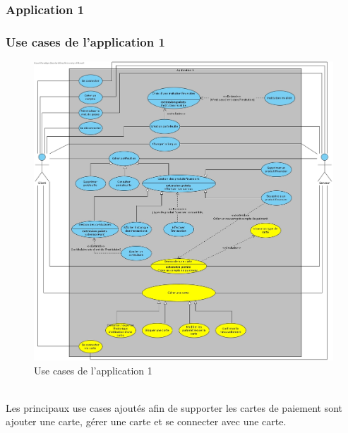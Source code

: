 \documentclass[../rapport.tex]{subfiles}
\begin{document}
\subsubsection{Application 1}

\subsubsection{Use cases de l'application 1}
	\begin{figure}[h!]
		\centering\includegraphics[scale=0.15]{ressources/photos_diagrammes/extensionTheo/diagrams1/useCases1.jpg}
		\caption{Use cases de l'application 1}
	\end{figure}\\

Les principaux use cases ajoutés afin de supporter les cartes de paiement sont ajouter une carte, gérer une carte et se connecter avec une carte.
\end{document}
